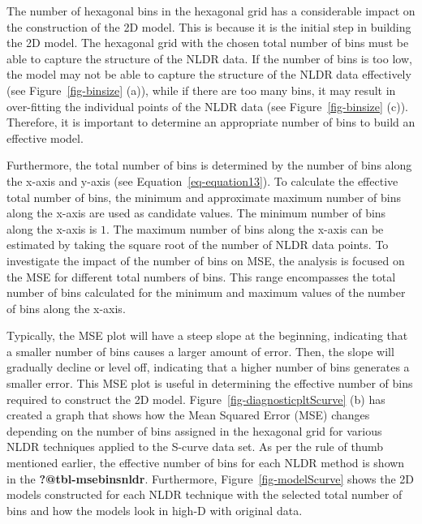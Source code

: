 \documentclass[
  12pt]{article}
\begin{document}
The number of hexagonal bins in the hexagonal grid has a considerable
impact on the construction of the 2D model. This is because it is the
initial step in building the 2D model. The hexagonal grid with the
chosen total number of bins must be able to capture the structure of the
NLDR data. If the number of bins is too low, the model may not be able
to capture the structure of the NLDR data effectively (see
Figure~\ref{fig-binsize} (a)), while if there are too many bins, it may
result in over-fitting the individual points of the NLDR data (see
Figure~\ref{fig-binsize} (c)). Therefore, it is important to determine
an appropriate number of bins to build an effective model.

Furthermore, the total number of bins is determined by the number of
bins along the x-axis and y-axis (see Equation~\ref{eq-equation13}). To
calculate the effective total number of bins, the minimum and
approximate maximum number of bins along the x-axis are used as
candidate values. The minimum number of bins along the x-axis is \(1\).
The maximum number of bins along the x-axis can be estimated by taking
the square root of the number of NLDR data points. To investigate the
impact of the number of bins on MSE, the analysis is focused on the MSE
for different total numbers of bins. This range encompasses the total
number of bins calculated for the minimum and maximum values of the
number of bins along the x-axis.

Typically, the MSE plot will have a steep slope at the beginning,
indicating that a smaller number of bins causes a larger amount of
error. Then, the slope will gradually decline or level off, indicating
that a higher number of bins generates a smaller error. This MSE plot is
useful in determining the effective number of bins required to construct
the 2D model. Figure~\ref{fig-diagnosticpltScurve} (b) has created a
graph that shows how the Mean Squared Error (MSE) changes depending on
the number of bins assigned in the hexagonal grid for various NLDR
techniques applied to the S-curve data set. As per the rule of thumb
mentioned earlier, the effective number of bins for each NLDR method is
shown in the \textbf{?@tbl-msebinsnldr}. Furthermore,
Figure~\ref{fig-modelScurve} shows the 2D models constructed for each
NLDR technique with the selected total number of bins and how the models
look in high-D with original data.
\end{document}
